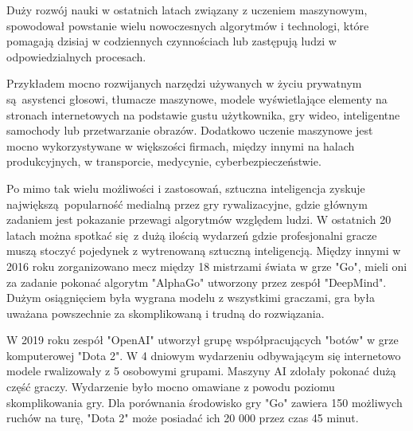 \documentclass[12pt,oneside,a4paper]{report}
\begin{document}
Duży rozwój nauki w ostatnich latach związany z uczeniem maszynowym, spowodował powstanie wielu
nowoczesnych algorytmów i technologi, które pomagają dzisiaj w codziennych czynnościach lub 
zastępują ludzi w odpowiedzialnych procesach. 

Przykładem mocno rozwijanych narzędzi używanych w życiu
prywatnym są asystenci głosowi, tłumacze maszynowe, modele wyświetlające elementy na
stronach internetowych na podstawie gustu użytkownika, gry wideo, inteligentne samochody lub przetwarzanie 
obrazów. Dodatkowo uczenie maszynowe jest mocno wykorzystywane w większości firmach, między 
innymi na halach produkcyjnych, w transporcie, medycynie, cyberbezpieczeństwie. 

Po mimo tak wielu możliwości i zastosowań, sztuczna inteligencja zyskuje największą popularność
medialną przez gry rywalizacyjne, gdzie głównym zadaniem jest pokazanie przewagi algorytmów względem
ludzi. W ostatnich 20 latach można spotkać się z dużą ilością wydarzeń gdzie profesjonalni gracze 
muszą stoczyć pojedynek z wytrenowaną sztuczną inteligencją. Między innymi w 2016 roku zorganizowano
mecz między 18 mistrzami świata w grze "Go", mieli oni za zadanie pokonać algorytm "AlphaGo"
utworzony przez zespół "DeepMind". Dużym osiągnięciem była wygrana modelu z wszystkimi
graczami, gra była uważana powszechnie za skomplikowaną i trudną do rozwiązania.

W 2019 roku zespół "OpenAI" utworzył grupę współpracujących "botów" w grze komputerowej
"Dota 2". W 4 dniowym wydarzeniu odbywającym się internetowo modele rwalizowały z 5 osobowymi
grupami. Maszyny AI zdołały pokonać dużą część graczy. Wydarzenie było mocno omawiane z powodu
poziomu skomplikowania gry. Dla porównania środowisko  gry "Go" zawiera 150 możliwych ruchów na turę, "Dota 2"
może posiadać ich 20 000 przez czas 45 minut.
\end{document}

